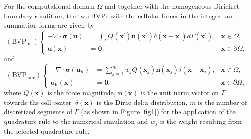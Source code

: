 \documentclass[pdflatex,sn-mathphys-num]{sn-jnl}
\newtheorem*{lemma star}{Lemma}
\begin{document}
For the computational domain $\Omega$ and together with the homogeneous Dirichlet boundary condition, the two BVPs with the cellular forces in the integral and summation forms are given by
\begin{equation*}
    \mathrm{(BVP_{int})}\left\{
    \begin{aligned}
        - \nabla \cdot {\boldsymbol \sigma}({\boldsymbol u}) &= \int_{\Gamma}Q(\boldsymbol{x}^{\prime })\boldsymbol{n}(\boldsymbol{x}^{\prime })\delta (\boldsymbol{x}-\boldsymbol{x}^{\prime })d\Gamma (\boldsymbol{x}^{\prime}), &\mbox{$\boldsymbol{x}\in \Omega$},\\
        \boldsymbol{u}(\boldsymbol{x})&=\boldsymbol{0}, &\mbox{$\boldsymbol{x}\in\partial\Omega$,}
    \end{aligned}
    \right.
\end{equation*}
and 
\begin{equation*}
    \mathrm{(BVP_{sum})}\left\{
    \begin{aligned}
        - \nabla \cdot {\boldsymbol\sigma}({\boldsymbol u}_h) &= \sum\limits_{j=1}^{m} w_jQ(\boldsymbol{x}_{j})\boldsymbol{n}(\boldsymbol{x} _{j})\delta (\boldsymbol{x}-\boldsymbol{x}_{j}), &\mbox{$\boldsymbol{x}\in \Omega$},\\
        \boldsymbol{u_h}(\boldsymbol{x})&=\boldsymbol{0}, &\mbox{$\boldsymbol{x}\in\partial\Omega$,}
    \end{aligned}
    \right.
\end{equation*}
where $Q(\boldsymbol{x})$ is the force magnitude, $\boldsymbol{n}(\boldsymbol{x})$ is the unit norm vector on $\Gamma$ towards the cell center, $\delta(\boldsymbol{x})$ is the Dirac delta distribution, $m$ is the number of discretized segments of $\Gamma$ (as shown in Figure \ref{fig1}) for the application of the quadrature rule to the numerical simulation and $w_j$ is the weight resulting from the selected quadrature rule.
\end{document}
